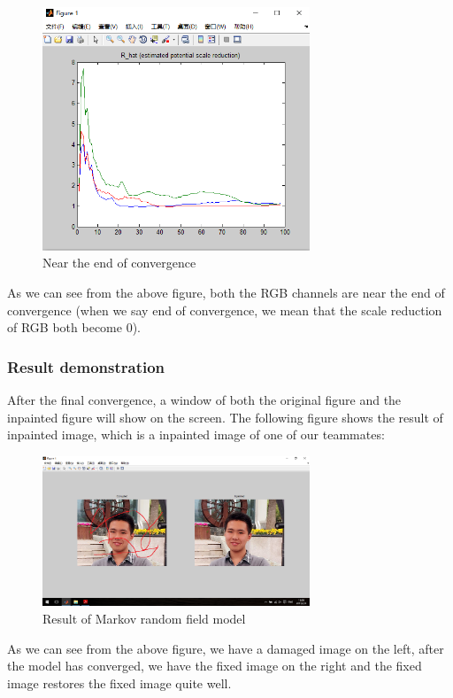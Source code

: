 \begin{figure}[H]
\centering
\includegraphics[width=8cm]{mrf_cov.png}
\caption{Near the end of convergence}
\end{figure}

As we can see from the above figure, both the RGB channels are near the end of convergence (when we say end of convergence, we mean that the scale reduction of RGB both become 0).

\subsubsection{Result demonstration}
After the final convergence, a window of both the original figure and the inpainted figure will show on the screen. The following figure shows the result of inpainted image, which is a inpainted image of one of our teammates:

\begin{figure}[H]
\centering
\includegraphics[width=8cm]{mrf_res.png}
\caption{Result of Markov random field model}
\end{figure}

As we can see from the above figure, we have a damaged image on the left, after the model has converged, we have the fixed image on the right and the fixed image restores the fixed image quite well.

